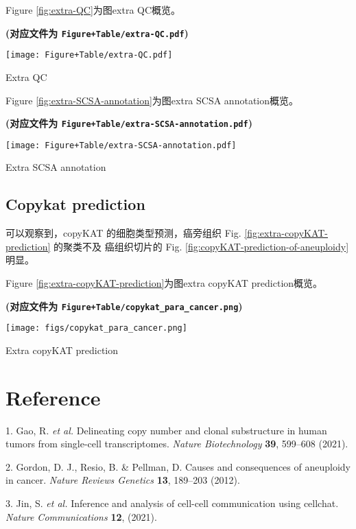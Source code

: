 \documentclass[
]{article}
\newenvironment{cslreferences}%
  {}%
  {\par}
\begin{document}
Figure \ref{fig:extra-QC}为图extra QC概览。

\textbf{(对应文件为 \texttt{Figure+Table/extra-QC.pdf})}

\def\@captype{figure}
\begin{center}
\texttt{[image: Figure+Table/extra-QC.pdf]}
\caption{Extra QC}\label{fig:extra-QC}
\end{center}

Figure \ref{fig:extra-SCSA-annotation}为图extra SCSA annotation概览。

\textbf{(对应文件为 \texttt{Figure+Table/extra-SCSA-annotation.pdf})}

\def\@captype{figure}
\begin{center}
\texttt{[image: Figure+Table/extra-SCSA-annotation.pdf]}
\caption{Extra SCSA annotation}\label{fig:extra-SCSA-annotation}
\end{center}

\hypertarget{copykat-prediction}{%
\subsection{Copykat prediction}\label{copykat-prediction}}

可以观察到，copyKAT 的细胞类型预测，癌旁组织 Fig. \ref{fig:extra-copyKAT-prediction} 的聚类不及 癌组织切片的 Fig. \ref{fig:copyKAT-prediction-of-aneuploidy} 明显。

Figure \ref{fig:extra-copyKAT-prediction}为图extra copyKAT prediction概览。

\textbf{(对应文件为 \texttt{Figure+Table/copykat\_para\_cancer.png})}

\def\@captype{figure}
\begin{center}
\texttt{[image: figs/copykat\_para\_cancer.png]}
\caption{Extra copyKAT prediction}\label{fig:extra-copyKAT-prediction}
\end{center}

\hypertarget{bibliography}{%
\section*{Reference}\label{bibliography}}

\hypertarget{refs}{}
\begin{cslreferences}
\leavevmode\hypertarget{ref-DelineatingCopGaoR2021}{}%
1. Gao, R. \emph{et al.} Delineating copy number and clonal substructure in human tumors from single-cell transcriptomes. \emph{Nature Biotechnology} \textbf{39}, 599--608 (2021).

\leavevmode\hypertarget{ref-CausesAndConsGordon2012}{}%
2. Gordon, D. J., Resio, B. \& Pellman, D. Causes and consequences of aneuploidy in cancer. \emph{Nature Reviews Genetics} \textbf{13}, 189--203 (2012).

\leavevmode\hypertarget{ref-InferenceAndAJinS2021}{}%
3. Jin, S. \emph{et al.} Inference and analysis of cell-cell communication using cellchat. \emph{Nature Communications} \textbf{12}, (2021).
\end{cslreferences}
\end{document}
